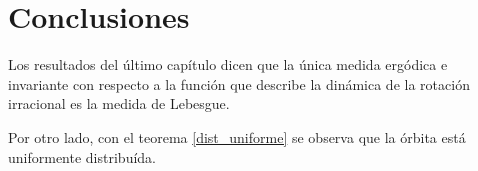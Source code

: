 \chapter*{Conclusiones}

Los resultados del último capítulo dicen que la única medida ergódica e invariante con respecto a la función que describe la dinámica de la rotación irracional es la medida de Lebesgue.

Por otro lado, con el teorema \ref{dist_uniforme} se observa que la órbita está uniformente distribuída.